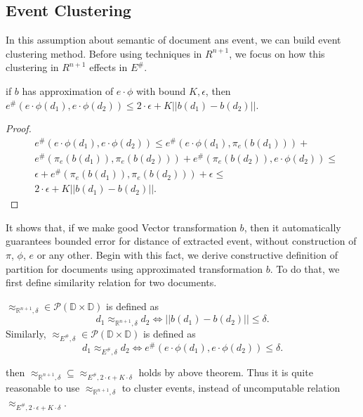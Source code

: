 \subsection{Event Clustering}

In this assumption about semantic of document ans event, we can build event clustering method. Before using techniques in $R^{n+1}$, we
focus on how this clustering in $R^{n+1}$ effects in $E^{\#}$.

\begin{theorem}
    if $b$ has approximation of $e \cdot \phi$ with bound $K, \epsilon$, then $e^{\#}(e \cdot \phi(d_{1}), e \cdot \phi(d_{2})) \leq 2 \cdot \epsilon + K || b(d_{1}) - b(d_{2}) || $.
\end{theorem}

\begin{proof}
    \begin{align*}
     & e^{\#}(e \cdot \phi(d_{1}), e \cdot \phi(d_{2})) \leq e^{\#}(e \cdot \phi(d_{1}), \pi_{e}(b(d_{1}))) + \\
     & e^{\#}(\pi_{e}(b(d_{1})), \pi_{e}(b(d_{2}))) + e^{\#}(\pi_{e}(b(d_{2})), e \cdot \phi(d_{2})) \leq \\
     & \epsilon + e^{\#}(\pi_{e}(b(d_{1})), \pi_{e}(b(d_{2}))) + \epsilon \leq \\
     & 2 \cdot \epsilon + K || b(d_{1}) - b(d_{2}) ||.
    \end{align*}
\end{proof}

It shows that, if we make good Vector transformation $b$, then it automatically guarantees bounded error for distance of extracted event, without
construction of $\pi$, $\phi$, $e$ or any other. Begin with this fact, we derive constructive definition of partition for documents using approximated
transformation $b$. To do that, we first define similarity relation for two documents.

\begin{definition}
    $\approx_{\mathbb{R}^{n+1}, \delta} \in \mathcal{P}(\mathbb{D \times D})$ is defined as \begin{displaymath}
        d_{1} \approx_{\mathbb{R}^{n+1}, \delta} d_{2} \Longleftrightarrow || b(d_{1}) - b(d_{2}) || \leq \delta.
    \end{displaymath}
    Similarly, $\approx_{E^{\#}, \delta} \in \mathcal{P}(\mathbb{D \times D})$ is defined as \begin{displaymath}
    d_{1} \approx_{E^{\#}, \delta} d_{2} \Longleftrightarrow e^{\#}(e \cdot \phi(d_{1}), e \cdot \phi(d_{2})) \leq \delta.
    \end{displaymath}
\end{definition}
then $\approx_{\mathbb{R}^{n+1}, \delta} \subseteq \approx_{E^{\#}, 2 \cdot \epsilon + K \cdot \delta}$ holds by above theorem. Thus it is quite
reasonable to use $\approx_{\mathbb{R}^{n+1}, \delta}$ to cluster events, instead of uncomputable relation $\approx_{E^{\#}, 2 \cdot \epsilon + K \cdot \delta}$.

